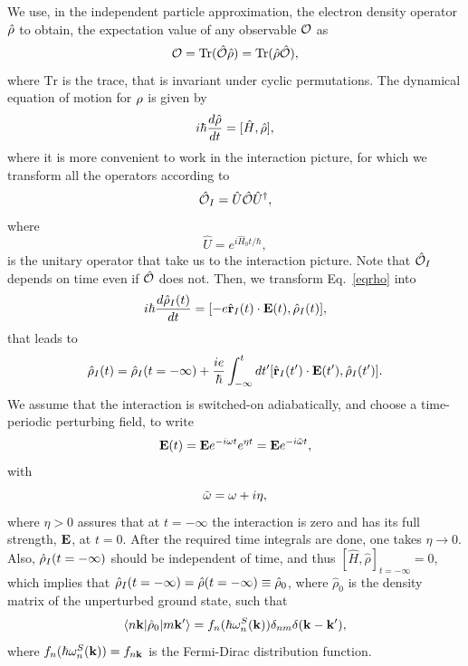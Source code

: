\documentclass[floatfix,prb,aps,superscriptaddress,11pt,preprint]{revtex4}
\begin{document}
We use, in the independent particle approximation, the electron density
operator $\hat{{\rho}}$ to obtain, the expectation value of any observable
${\cal O}$ as
\begin{equation}\label{traza}
  {\cal O}=\mathrm{Tr}(\hat{{\cal O}}\hat\rho)=\mathrm{Tr}(\hat\rho\hat{{\cal O}}),
\end{equation}
where $\mathrm{Tr}$ is the trace, that is
invariant under cyclic permutations.
The dynamical equation of motion for ${\rho}$ is given by
\begin{equation}\label{eqrho}
i\hbar \frac{d\hat{{\rho}}}{dt}=[\hat{H},\hat{{\rho}}]
,
\end{equation}
where it is more convenient to work in the interaction picture, for
which we transform all the operators according to 
\begin{equation}\label{ip}
\hat{{\cal O}}_I=\hat{U}\hat{{\cal O}}\hat{U}^\dagger,
\end{equation}
where
\begin{equation}\label{ou}
\hat{U}=e^{i\hat{H}_0t/\hbar},
\end{equation}
is the unitary operator that take us to the interaction picture.
Note that $\hat{{\cal O}}_I$ depends on time even if $\hat{{\cal O}}$ does not.
Then, we transform Eq.~\eqref{eqrho} into
\begin{equation}\label{intrho}
i\hbar\frac{d\hat{{\rho}}_I(t)}{dt}=[-e\hat{\mathbf{r}}_I(t)\cdot\mathbf{E}(t),\hat{{\rho}}_I(t)],
\end{equation}
that leads to
\begin{equation}\label{intrho2}
\hat{{\rho}}_I(t)=\hat{{\rho}}_I(t=-\infty)
+
\frac{ie}{\hbar}\int_{-\infty}^t dt'[\hat{\mathbf{r}}_I(t')\cdot\mathbf{E}(t'),\hat{{\rho}}_I(t')].
\end{equation}
We assume that the interaction is switched-on adiabatically, and
choose a time-periodic perturbing field, to write
\begin{equation}\label{efield}
\mathbf{E}(t)=\mathbf{E} e^{-i\omega t}e^{\eta t}=\mathbf{E} e^{-i\tilde\omega t}
,
\end{equation}
with
\begin{equation}\label{got}
\tilde\omega=\omega+i\eta
,
\end{equation} 
where $\eta > 0$ assures
that at $t=-\infty$ the interaction is zero and has its full strength, $\mathbf{E}$,
at $t=0$. After the required time integrals are done, one takes
$\eta\to 0$. 
Also, $\hat{{\rho}}_I(t=-\infty)$ should be independent of time, and thus 
$[\hat{H},\hat\rho]_{t=-\infty}=0$, which implies that 
$\hat{{\rho}}_I(t=-\infty)=\hat\rho(t=-\infty)\equiv\hat\rho_0$,
where $\hat\rho_0$ is
the density matrix of the unperturbed ground state,
such that
\begin{equation}\label{nrhon}
\langle n\mathbf{k} |\hat{{\rho}}_0| m\mathbf{k}' \rangle=f_n(\hbar\omega^S_n(\mathbf{k}))\delta_{nm}\delta(\mathbf{k}-\mathbf{k}')
,
\end{equation}
where $f_n(\hbar\omega^S_n(\mathbf{k}))=f_{n\mathbf{k}}$ is the Fermi-Dirac distribution function.
\end{document}
